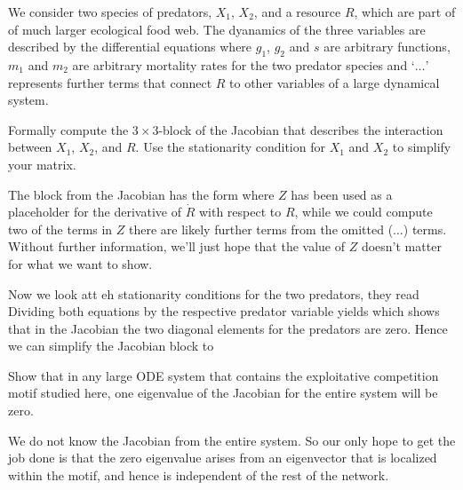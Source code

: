 
We consider two species of predators, $X_1$, $X_2$, and a resource $R$, which are part of of much larger ecological food web. The dyanamics of the three variables are described by the differential equations
where $g_1$, $g_2$ and $s$ are arbitrary functions, $m_1$ and $m_2$ are arbitrary mortality rates for the two predator species and `$\ldots$' represents further terms that connect $R$ to other variables of a large dynamical system. 

\subquestion Formally compute the $3\times 3$-block of the Jacobian that describes the interaction between $X_1$, $X_2$, and $R$. Use the stationarity condition for $X_1$ and $X_2$ to simplify your matrix. 

\solution
The block from the Jacobian has the form
where $Z$ has been used as a placeholder for the derivative of $\dot{R}$ with respect to $R$, while we could compute two of the terms in $Z$ there are likely further terms from the omitted ($\ldots$) terms. Without further information, we'll just hope that the value of $Z$ doesn't matter for what we want to show.  

Now we look att eh stationarity conditions for the two predators, they read
Dividing both equations by the respective predator variable yields
which shows that in the Jacobian the two diagonal elements for the predators are zero.  Hence we can simplify the Jacobian block to  

\subquestion Show that in any large ODE system that contains the exploitative competition motif studied here, one eigenvalue of the Jacobian for the entire system will be zero.

\solution
We do not know the Jacobian from the entire system. So our only hope to get the job done is that the zero eigenvalue arises from an eigenvector that is localized within the motif, and hence is independent of the rest of the network. 

